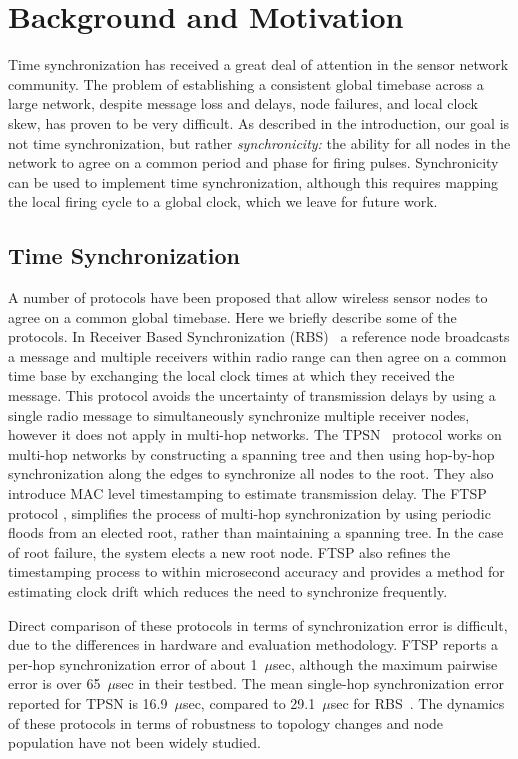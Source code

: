 \documentclass{sig-alternate}
\begin{document}
\section{Background and Motivation}
\label{sec-background}

Time synchronization has received a great deal of attention in the
sensor network community. The problem of establishing a consistent global
timebase across a large network, despite message loss and delays, node
failures, and local clock skew, has proven to be very difficult. As
described in the introduction, our goal is not time synchronization,
but rather {\em synchronicity:} the ability for all nodes in the
network to agree on a common period and phase for firing
pulses. Synchronicity can be used to implement time synchronization,
although this requires mapping the local firing cycle to a
global clock, which we leave for future work. 

\subsection{Time Synchronization}

A number of protocols have been proposed that allow wireless sensor
nodes to agree on a common global timebase. Here we briefly describe
some of the protocols. In Receiver Based Synchronization
(RBS)~\cite{rbs} a reference node broadcasts a message and multiple
receivers within radio range can then agree on a common time base by
exchanging the local clock times at which they received the message.
This protocol avoids the uncertainty of transmission delays by using a
single radio message to simultaneously synchronize multiple receiver
nodes, however it does not apply in multi-hop networks. The
TPSN~\cite{tpsn} protocol works on multi-hop networks by constructing
a spanning tree and then using hop-by-hop synchronization along the
edges to synchronize all nodes to the root. They also introduce MAC
level timestamping to estimate transmission delay. The FTSP
protocol \cite{ftsp}, simplifies the process of multi-hop
synchronization by using periodic floods from an elected root, rather
than maintaining a spanning tree. In the case of root failure, the
system elects a new root node. FTSP also refines the timestamping
process to within microsecond accuracy and provides a method for
estimating clock drift which reduces the need to synchronize
frequently.

Direct comparison of these protocols in terms of synchronization error
is difficult, due to the differences in hardware and evaluation
methodology. FTSP reports a per-hop synchronization error of about
1~$\mu$sec, although the maximum pairwise error is over 65~$\mu$sec in
their testbed.  The mean single-hop synchronization error reported for
TPSN is 16.9~$\mu$sec, compared to 29.1~$\mu$sec for RBS~\cite{tpsn}.
The dynamics of these protocols in terms of robustness to topology
changes and node population have not been widely studied.
\end{document}
